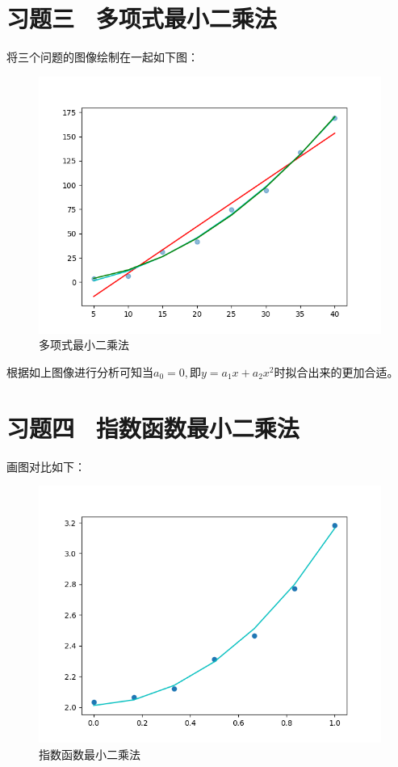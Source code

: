 \section{习题三 \ 多项式最小二乘法}
将三个问题的图像绘制在一起如下图：
\begin{figure}[htbp]
    \centering

    {
        \begin{minipage}[b]{.9\linewidth}
            \centering
            \includegraphics[scale=0.5]{pic/3/3.png}
        \end{minipage}
    }


    \caption{多项式最小二乘法}
    
\end{figure}

根据如上图像进行分析可知当$a_0 = 0, 即y = a_1x + a_2x^2$时拟合出来的更加合适。
\clearpage
\section{习题四 \ 指数函数最小二乘法}
画图对比如下：
\begin{figure}[htbp]
    \centering

    {
        \begin{minipage}[b]{.9\linewidth}
            \centering
            \includegraphics[scale=0.5]{pic/4/4.png}
        \end{minipage}
    }


    \caption{指数函数最小二乘法}
    
\end{figure}